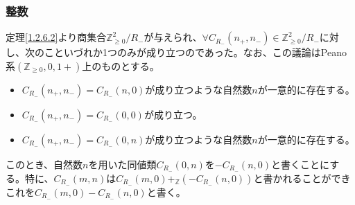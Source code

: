 \documentclass[dvipdfmx]{jsarticle}
\begin{document}
\subsubsection{整数}%
\begin{dfn}
定理\ref{1.2.6.2}より商集合$\mathbb{Z}_{\geq 0}^{2} /R_{-} $が与えられ、$\forall C_{R_{-}}\left( n_{+},n_{-} \right) \in \mathbb{Z}_{\geq 0}^{2} /R_{-} $に対し、次のこといづれか1つのみが成り立つのであった。なお、この議論はPeano系$\left( \mathbb{Z}_{\geq 0},0,1 + \right)$上のものとする。
\begin{itemize}
\item
  $C_{R_{-}}\left( n_{+},n_{-} \right) = C_{R_{-}}(n,0)$が成り立つような自然数$n$が一意的に存在する。
\item
  $C_{R_{-}}\left( n_{+},n_{-} \right) = C_{R_{-}}(0,0)$が成り立つ。
\item
  $C_{R_{-}}\left( n_{+},n_{-} \right) = C_{R_{-}}(0,n)$が成り立つような自然数$n$が一意的に存在する。
\end{itemize}
このとき、自然数$n$を用いた同値類$C_{R_{-}}(0,n)$を$- C_{R_{-}}(n,0)$と書くことにする。特に、$C_{R_{-}}(m,n)$は$C_{R_{-}}(m,0) +_{\mathbb{Z}}\left( - C_{R_{-}}(n,0) \right)$と書かれることができこれを$C_{R_{-}}(m,0) - C_{R_{-}}(n,0)$と書く。
\end{dfn}
\end{document}
